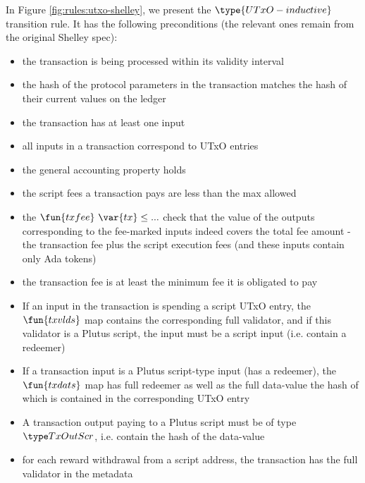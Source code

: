 In Figure \ref{fig:rules:utxo-shelley}, we present the $\type{UTxO-inductive}$
transition rule. It has the following preconditions (the relevant ones remain
from the original Shelley spec):

\begin{itemize}
  \item the transaction is being processed within its validity interval

  \item the hash of the protocol parameters in the transaction matches
  the hash of their current values on the ledger

  \item the transaction has at least one input

  \item all inputs in a transaction correspond to UTxO entries

  \item the general accounting property holds

  \item the script fees a transaction pays are less than the max allowed

  \item the $\fun{txfee}~\var{tx} \leq ...$ check
  that the value of the outputs corresponding to the fee-marked inputs
  indeed covers the total fee amount - the transaction fee plus the
  script execution fees (and these inputs contain only
  Ada tokens)

  \item the transaction fee is at least the minimum fee it is obligated to pay

  \item If an input in the transaction is spending a script UTxO entry,
  the $\fun{txvlds}$ map contains the corresponding full validator, and
  if this validator is a Plutus script, the input must be a script input
  (i.e. contain a redeemer)

  \item If a transaction input is a Plutus script-type input (has a redeemer), the
  $\fun{txdats}$ map has full redeemer as well as the full data-value
  the hash of which is contained in the corresponding UTxO entry

  \item A transaction output paying to a Plutus script must be of type
  $\TxOutScr$, i.e. contain the hash of the data-value

  \item for each reward withdrawal from a script address, the transaction
  has the full validator in the metadata


\end{itemize}
